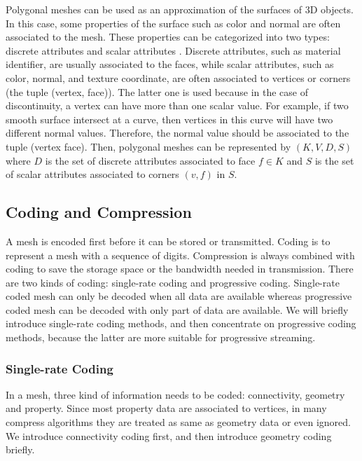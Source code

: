 \documentclass[11pt, a4paper]{report}
\begin{document}
    
    Polygonal meshes can be used as an approximation of the surfaces
    of 3D objects. In this case, some properties of the surface such
    as color and normal are often associated to the mesh. These
    properties can be categorized into two types: discrete attributes
    and scalar attributes \label{property}. Discrete attributes, such
    as material identifier, are usually associated to the faces, while
    scalar attributes, such as color, normal, and texture coordinate,
    are often associated to vertices or corners (the tuple (vertex,
    face)). The latter one is used because in the case of
    discontinuity, a vertex can have more than one scalar value. For
    example, if two smooth surface intersect at a curve, then vertices
    in this curve will have two different normal values. Therefore,
    the normal value should be associated to the tuple (vertex face).
    Then, polygonal meshes can be represented by $(K, V, D, S)$ where
    $D$ is the set of discrete attributes associated to face $f \in
    K$ and $S$ is the set of scalar attributes associated to corners $(v, f)$ in $S$.
    
    \subsection{Coding and Compression}
    A mesh is encoded first before it can be stored or
    transmitted. Coding is to represent a mesh with a sequence of
    digits. Compression is always combined with coding to save the storage space
    or the bandwidth needed in transmission. 
    There are two kinds of coding:
    single-rate coding and progressive coding. 
    Single-rate coded mesh can only be decoded when all data are available 
    whereas progressive coded mesh can be decoded with only part of data are available. 
    We will briefly introduce single-rate coding methods, and then concentrate on
    progressive coding methods, because the latter are more suitable for progressive streaming.
    
    \subsubsection{Single-rate Coding} \label{single_rate}
    In a mesh, three kind of information needs to be coded:
    connectivity, geometry and property. 
    Since most property data are associated to vertices, 
    in many compress algorithms they are treated as same as geometry data or even
    ignored. We introduce connectivity coding first, and then introduce geometry coding briefly.
    
\end{document}
